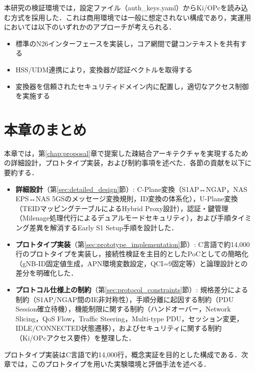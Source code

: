 本研究の検証環境では，設定ファイル（auth\_keys.yaml）からKi/OPcを読み込む方式を採用した．これは商用環境では一般に想定されない構成であり，実運用においては以下のいずれかのアプローチが考えられる．
\begin{itemize}
\item 標準のN26インターフェースを実装し，コア網間で鍵コンテキストを共有する
\item HSS/UDM連携により，変換器が認証ベクトルを取得する
\item 変換器を信頼されたセキュリティドメイン内に配置し，適切なアクセス制御を実施する
\end{itemize}
\section{本章のまとめ}

本章では，第\ref{chap:proposal}章で提案した疎結合アーキテクチャを実現するための詳細設計，プロトタイプ実装，および制約事項を述べた．各節の貢献を以下に要約する．

\begin{itemize}
    \item \textbf{詳細設計}（第\ref{sec:detailed_design}節）: C-Plane変換（S1AP↔NGAP，NAS EPS↔NAS 5GSのメッセージ変換規則，ID変換の体系化），U-Plane変換（TEIDマッピングテーブルによるHybrid Proxy設計），認証・鍵管理（Milenage処理代行によるデュアルモードセキュリティ），および手順タイミング差異を解消するEarly S1 Setup手順を設計した．
    \item \textbf{プロトタイプ実装}（第\ref{sec:prototype_implementation}節）: C言語で約14,000行のプロトタイプを実装し，接続性検証を主目的としたPoCとしての簡略化（gNB-ID固定値生成，APN環境変数設定，QCI=9固定等）と論理設計との差分を明確化した．
    \item \textbf{プロトコル仕様上の制約}（第\ref{sec:protocol_constraints}節）: 規格差分による制約（S1AP/NGAP間のIE非対称性），手順分離に起因する制約（PDU Session確立待機），機能制限に関する制約（ハンドオーバー，Network Slicing，QoS Flow，Traffic Steering，Multi-type PDU，セッション変更，IDLE/CONNECTED状態遷移），およびセキュリティに関する制約（Ki/OPcアクセス要件）を整理した．
\end{itemize}

プロトタイプ実装はC言語で約14,000行，概念実証を目的とした構成である．次章では，このプロトタイプを用いた実験環境と評価手法を述べる．
